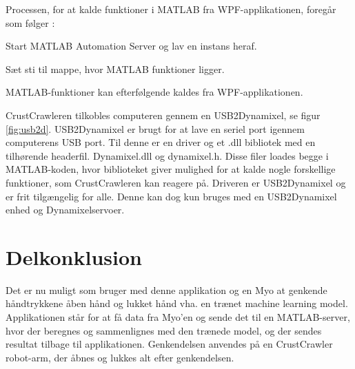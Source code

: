 
Processen, for at kalde funktioner i MATLAB fra WPF-applikationen, foregår som følger \citep{RefWorks:15}:
\begin{myEnumerate}
	\item Start MATLAB Automation Server og lav en instans heraf.
	\item Sæt sti til mappe, hvor MATLAB funktioner ligger.
	\item MATLAB-funktioner kan efterfølgende kaldes fra WPF-applikationen.
\end{myEnumerate}


CrustCrawleren tilkobles computeren gennem en USB2Dynamixel, se figur \ref{fig:usb2d}. USB2Dynamixel er brugt for at lave en seriel port igennem computerens USB port. Til denne er en driver og et .dll bibliotek med en tilhørende headerfil. Dynamixel.dll og dynamixel.h. Disse filer loades begge i MATLAB-koden, hvor biblioteket giver mulighed for at kalde nogle forskellige funktioner, som CrustCrawleren kan reagere på. Driveren er USB2Dynamixel \citep{agaverobot} og er frit tilgængelig for alle. Denne kan dog kun bruges med en USB2Dynamixel enhed og Dynamixelservoer.

\section{Delkonklusion}
Det er nu muligt som bruger med denne applikation og en Myo at genkende håndtrykkene åben hånd og lukket hånd vha. en trænet machine learning model. Applikationen står for at få data fra Myo'en og sende det til en MATLAB-server, hvor der beregnes og sammenlignes med den trænede model, og der sendes resultat tilbage til applikationen. Genkendelsen anvendes på en CrustCrawler robot-arm, der åbnes og lukkes alt efter genkendelsen.